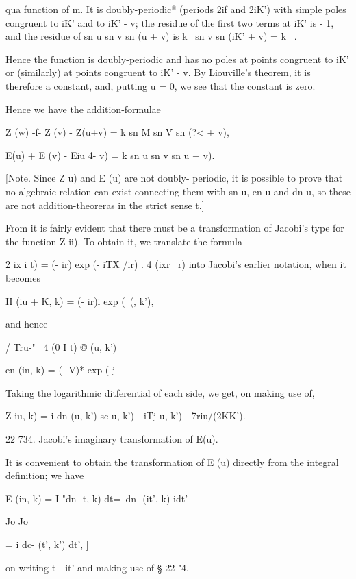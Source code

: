 %
%

qua function of m. It is doubly-periodic* (periods 2if and 2iK') with
simple poles congruent to iK' and to iK' - v; the residue of the
first two terms at iK' is - 1, and the residue of sn u sn v sn (u + v)
is k~ sn v sn (iK' + v) = k~ .

Hence the function is doubly-periodic and has no poles at points
congruent to iK' or (similarly) at points congruent to iK' - v. By
Liouville's theorem, it is therefore a constant, and, putting u = 0,
we see that the constant is zero.

Hence we have the addition-formulae

Z (w) -f- Z (v) - Z(u+v) = k sn M sn V sn (?< + v),

E(u) + E (v) - Eiu 4- v) = k sn u sn v sn u + v).

[Note. Since Z u) and E (u) are not doubly- periodic, it is possible
to prove that no algebraic relation can exist connecting them with sn
u, en u and dn u, so these are not addition-theoreras in the strict
sense t.]


From it is fairly evident that there must be a transformation
of Jacobi's type for the function Z ii). To obtain it, we translate
the formula

 2 ix i t) = (- ir) exp (- iTX /ir) . 4 (ixr \ r) into Jacobi's
earlier notation, when it becomes

H (iu + K, k) = (- ir)i exp (\ (, k'),

and hence

/ Tru-" \ 4 (0 I t) © (u, k')

en (in, k) = (- V)* exp ( j

Taking the logarithmic ditferential of each side, we get, on making
use of,

Z iu, k) = i dn (u, k') sc u, k') - iTj u, k') - 7riu/(2KK').

22 734. Jacobi's imaginary transformation of E(u).

It is convenient to obtain the transformation of E (u) directly from
the integral definition; we have

E (in, k) = I "dn- t, k) dt=\ dn- (it', k) idt'

Jo Jo

= i dc- (t', k') dt', ]

on writing t - it' and making use of § 22 "4.

